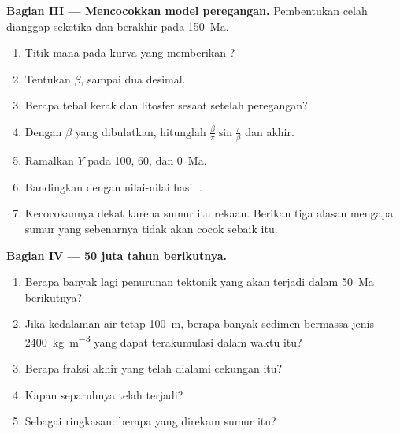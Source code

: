 \begin{problem}
\noindent\textbf{Bagian III --- Mencocokkan model peregangan.} Pembentukan celah dianggap seketika
dan berakhir pada \qty{150}{Ma}.
\begin{enumerate}[resume]
  \item Titik mana pada kurva yang memberikan ?
  \item Tentukan  $\beta$, sampai dua desimal.
  \item Berapa tebal kerak dan litosfer sesaat setelah peregangan?
  \item Dengan $\beta$ yang dibulatkan, hitunglah $\frac{\beta}{\pi}\sin\frac{\pi}{\beta}$ dan  akhir.
  \item Ramalkan $Y$ pada 100, 60, dan \qty{0}{Ma}.
  \item Bandingkan dengan nilai-nilai hasil .
  \item Kecocokannya dekat karena sumur itu rekaan. Berikan tiga alasan mengapa sumur yang sebenarnya
        tidak akan cocok sebaik itu.
\end{enumerate}

\noindent\textbf{Bagian IV --- 50 juta tahun berikutnya.}
\begin{enumerate}[resume]
  \item Berapa banyak lagi penurunan tektonik yang akan terjadi dalam \qty{50}{Ma} berikutnya?
  \item Jika kedalaman air tetap \qty{100}{m}, berapa banyak sedimen bermassa jenis
        \qty{2400}{kg.m^{-3}} yang dapat terakumulasi dalam waktu itu?
  \item Berapa fraksi  akhir yang telah dialami cekungan itu?
  \item Kapan separuhnya telah terjadi?
  \item Sebagai ringkasan:  berapa yang direkam sumur itu?
\end{enumerate}
\end{problem}
